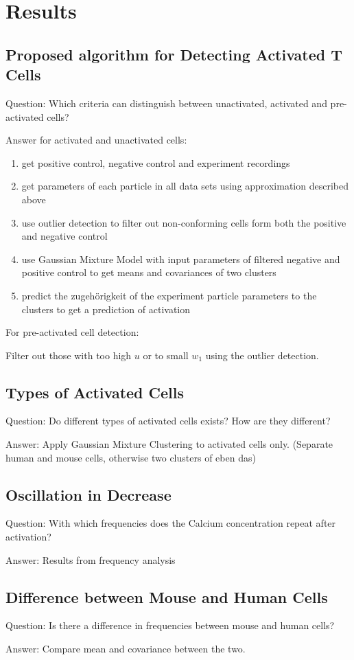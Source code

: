 \chapter{Results}
\label{chapter:results}

\section{Proposed algorithm for Detecting Activated T Cells}
\label{sec:proposed-algorithm}

Question: Which criteria can distinguish between unactivated, activated and pre-activated cells?

Answer for activated and unactivated cells:

\begin{enumerate}
	\item get positive control, negative control and experiment recordings
	\item get parameters of each particle in all data sets using approximation described above
	\item use outlier detection to filter out non-conforming cells form both the positive and negative control
	\item use Gaussian Mixture Model with input parameters of filtered negative and positive control to get means and covariances of two clusters
	\item predict the zugehörigkeit of the experiment particle parameters to the clusters to get a prediction of activation
\end{enumerate}

For pre-activated cell detection:

Filter out those with too high $u$ or to small $w_1$ using the outlier detection.

\section{Types of Activated Cells}

Question: Do different types of activated cells exists? How are they different?

Answer: Apply Gaussian Mixture Clustering to activated cells only. (Separate human and mouse cells, otherwise two clusters of eben das)

\section{Oscillation in Decrease}

Question: With which frequencies does the Calcium concentration repeat after activation?

Answer: Results from frequency analysis

\section{Difference between Mouse and Human Cells}

Question: Is there a difference in frequencies between mouse and human cells?

Answer: Compare mean and covariance between the two.